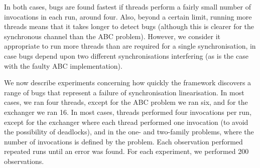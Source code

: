 


In both cases, bugs are found fastest if threads perform a fairly small number
of invocations in each run, around four.  Also, beyond a certain limit,
running more threads means that it takes longer to detect bugs (although this
is clearer for the synchronous channel than the ABC problem).  However, we
consider it appropriate to run more threads than are required for a single
synchronisation, in case bugs depend upon two different synchronisations
interfering (as is the case with the faulty ABC implementation).




We now describe experiments concerning how quickly the framework discovers a
range of bugs that represent a failure of synchronisation linearisation.  In
most cases, we ran four threads, except for the ABC problem we ran six, and
for the exchanger we ran 16.  In most cases, threads performed four
invocations per run, except for the exchanger where each thread performed one
invocation (to avoid the possibility of deadlocks), and in the one- and
two-family problems, where the number of invocations is defined by the
problem.  Each observation performed repeated runs until an error was found.
For each experiment, we performed 200 observations.


